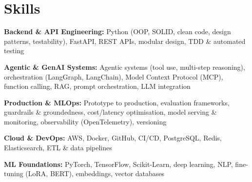 \documentclass[10pt,a4paper]{article}
\begin{document}
\section{Skills}
\begin{tight}
  \item[\textcolor{accent}{\small$\bullet$}] \textbf{Backend \& API Engineering:} Python (OOP, SOLID, clean code, design patterns, testability), FastAPI, REST APIs, modular design, TDD \& automated testing
  \item[\textcolor{accent}{\small$\bullet$}] \textbf{Agentic \& GenAI Systems:} Agentic systems (tool use, multi-step reasoning), orchestration (LangGraph, LangChain), Model Context Protocol (MCP), function calling, RAG, prompt orchestration, LLM integration
  \item[\textcolor{accent}{\small$\bullet$}] \textbf{Production \& MLOps:} Prototype to production, evaluation frameworks, guardrails \& groundedness, cost/latency optimisation, model serving \& monitoring, observability (OpenTelemetry), versioning
  \item[\textcolor{accent}{\small$\bullet$}] \textbf{Cloud \& DevOps:} AWS, Docker, GitHub, CI/CD, PostgreSQL, Redis, Elasticsearch, ETL \& data pipelines
  \item[\textcolor{accent}{\small$\bullet$}] \textbf{ML Foundations:} PyTorch, TensorFlow, Scikit-Learn, deep learning, NLP, fine-tuning (LoRA, BERT), embeddings, vector databases
\end{tight}

\end{document}
